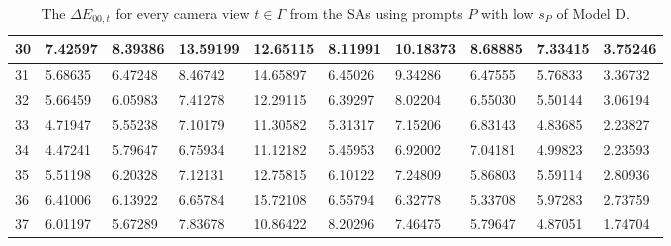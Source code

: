 \begin{table}[H]
{\begin{tabular}{|l|l|l|l|l|l|l|l|l|l|}
        30 & 7.42597 & 8.39386 & 13.59199 & 12.65115 & 8.11991 & 10.18373 & 8.68885 & 7.33415 & 3.75246 \\ \hline
        31 & 5.68635 & 6.47248 & 8.46742 & 14.65897 & 6.45026 & 9.34286 & 6.47555 & 5.76833 & 3.36732 \\ \hline
        32 & 5.66459 & 6.05983 & 7.41278 & 12.29115 & 6.39297 & 8.02204 & 6.55030 & 5.50144 & 3.06194 \\ \hline
        33 & 4.71947 & 5.55238 & 7.10179 & 11.30582 & 5.31317 & 7.15206 & 6.83143 & 4.83685 & 2.23827 \\ \hline
        34 & 4.47241 & 5.79647 & 6.75934 & 11.12182 & 5.45953 & 6.92002 & 7.04181 & 4.99823 & 2.23593 \\ \hline
        35 & 5.51198 & 6.20328 & 7.12131 & 12.75815 & 6.10122 & 7.24809 & 5.86803 & 5.59114 & 2.80936 \\ \hline
        36 & 6.41006 & 6.13922 & 6.65784 & 15.72108 & 6.55794 & 6.32778 & 5.33708 & 5.97283 & 2.73759 \\ \hline
        37 & 6.01197 & 5.67289 & 7.83678 & 10.86422 & 8.20296 & 7.46475 & 5.79647 & 4.87051 & 1.74704 \\ \hline
    \end{tabular}}
	\caption{The $ \Delta E_{00,t}$ for every camera view $t \in \varGamma$ from the SAs using prompts $P$ with low $s_P$ of Model D.}
\end{table}

